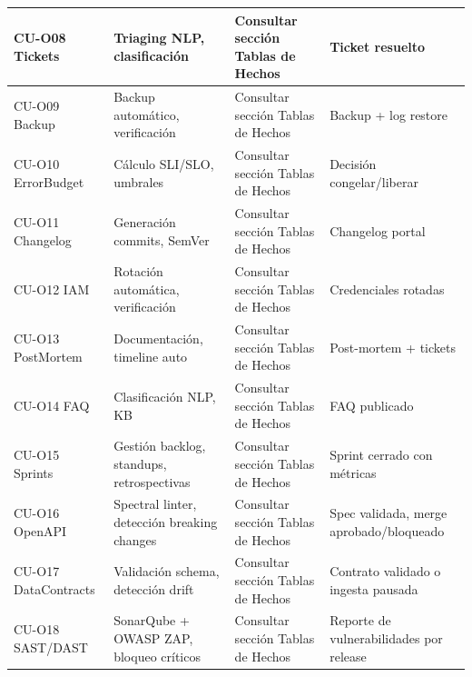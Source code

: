 ﻿\documentclass[11pt, letterpaper]{article}
\begin{document}
\begin{table}[H]
\begin{tabularx}{\linewidth}{>{\raggedright\arraybackslash}p{2cm} >{\raggedright\arraybackslash}p{3.5cm} >{\raggedright\arraybackslash}p{3.5cm} >{\raggedright\arraybackslash}X}
\midrule

CU-O08 Tickets & Triaging NLP, clasificación & Consultar sección Tablas de Hechos & Ticket resuelto \\

\midrule

CU-O09 Backup & Backup automático, verificación & Consultar sección Tablas de Hechos & Backup + log restore \\

\midrule

CU-O10 ErrorBudget & Cálculo SLI/SLO, umbrales & Consultar sección Tablas de Hechos & Decisión congelar/liberar \\

\midrule

CU-O11 Changelog & Generación commits, SemVer & Consultar sección Tablas de Hechos & Changelog portal \\

\midrule

CU-O12 IAM & Rotación automática, verificación & Consultar sección Tablas de Hechos & Credenciales rotadas \\

\midrule

CU-O13 PostMortem & Documentación, timeline auto & Consultar sección Tablas de Hechos & Post-mortem + tickets \\

\midrule

CU-O14 FAQ & Clasificación NLP, KB & Consultar sección Tablas de Hechos & FAQ publicado \\

\midrule

CU-O15 Sprints & Gestión backlog, standups, retrospectivas & Consultar sección Tablas de Hechos & Sprint cerrado con métricas \\

\midrule

CU-O16 OpenAPI & Spectral linter, detección breaking changes & Consultar sección Tablas de Hechos & Spec validada, merge aprobado/bloqueado \\

\midrule

CU-O17 DataContracts & Validación schema, detección drift & Consultar sección Tablas de Hechos & Contrato validado o ingesta pausada \\

\midrule

CU-O18 SAST/DAST & SonarQube + OWASP ZAP, bloqueo críticos & Consultar sección Tablas de Hechos & Reporte de vulnerabilidades por release \\


\end{tabularx}
\end{table}
\end{document}
